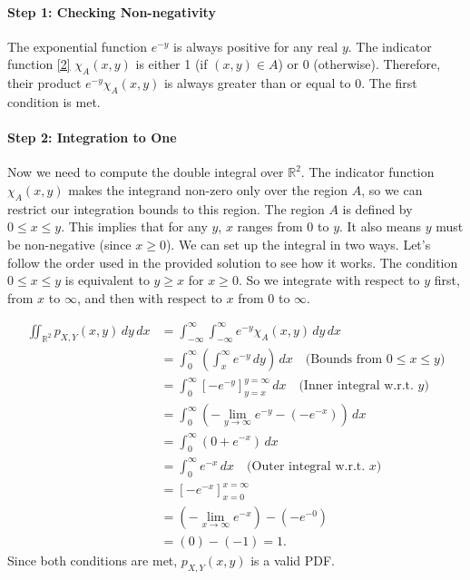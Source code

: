 \documentclass[11pt,a4paper]{article}
\begin{document}
\paragraph{Step 1: Checking Non-negativity}
The exponential function $e^{-y}$ is always positive for any real $y$. The indicator function \hyperlink{ref:indicator}{[2]} $\chi_A(x,y)$ is either 1 (if $(x,y) \in A$) or 0 (otherwise). Therefore, their product $e^{-y} \chi_A(x,y)$ is always greater than or equal to 0. The first condition is met.

\paragraph{Step 2: Integration to One}
Now we need to compute the double integral over $\mathbb{R}^2$. The indicator function $\chi_A(x,y)$ makes the integrand non-zero only over the region $A$, so we can restrict our integration bounds to this region. The region $A$ is defined by $0 \le x \le y$. This implies that for any $y$, $x$ ranges from $0$ to $y$. It also means $y$ must be non-negative (since $x \ge 0$).
We can set up the integral in two ways. Let's follow the order used in the provided solution to see how it works. The condition $0 \le x \le y$ is equivalent to $y \ge x$ for $x \ge 0$. So we integrate with respect to $y$ first, from $x$ to $\infty$, and then with respect to $x$ from $0$ to $\infty$.

\begin{align*}
    \iint_{\mathbb{R}^2} p_{X,Y}(x,y) \,dy\,dx &= \int_{-\infty}^{\infty} \int_{-\infty}^{\infty} e^{-y} \chi_A(x,y) \,dy\,dx \\
    &= \int_{0}^{\infty} \left( \int_{x}^{\infty} e^{-y} \,dy \right) \,dx \quad \text{(Bounds from } 0 \le x \le y\text{)} \\
    &= \int_{0}^{\infty} \left[ -e^{-y} \right]_{y=x}^{y=\infty} \,dx \quad \text{(Inner integral w.r.t. } y\text{)} \\
    &= \int_{0}^{\infty} \left( - \lim_{y\to\infty} e^{-y} - (-e^{-x}) \right) \,dx \\
    &= \int_{0}^{\infty} (0 + e^{-x}) \,dx \\
    &= \int_{0}^{\infty} e^{-x} \,dx \quad \text{(Outer integral w.r.t. } x\text{)} \\
    &= \left[ -e^{-x} \right]_{x=0}^{x=\infty} \\
    &= (- \lim_{x\to\infty} e^{-x}) - (-e^{-0}) \\
    &= (0) - (-1) = 1.
\end{align*}
Since both conditions are met, $p_{X,Y}(x,y)$ is a valid PDF.
\end{document}
